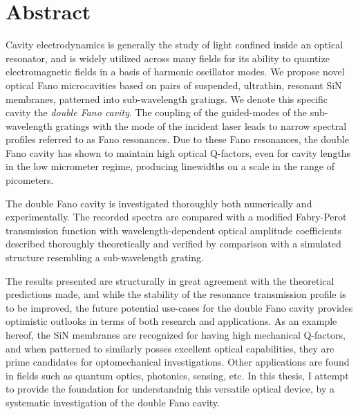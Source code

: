 \section*{Abstract}

Cavity electrodynamics is generally the study of light confined inside an optical resonator, and is widely utilized across many fields for its ability to quantize electromagnetic fields in a basis of harmonic oscillator modes. We propose novel optical Fano microcavities based on pairs of suspended, ultrathin, resonant SiN membranes, patterned into sub-wavelength gratings. We denote this specific cavity the \emph{double Fano cavity}. The coupling of the guided-modes of the sub-wavelength gratings with the mode of the incident laser leads to narrow spectral profiles referred to as Fano resonances. Due to these Fano resonances, the double Fano cavity has shown to maintain high optical Q-factors, even for cavity lengths in the low micrometer regime, producing linewidths on a scale in the range of picometers.  

The double Fano cavity is investigated thoroughly both numerically and experimentally. The recorded spectra are compared with a modified Fabry-Perot transmission function with wavelength-dependent optical amplitude coefficients described thoroughly theoretically and verified by comparison with a simulated structure resembling a sub-wavelength grating. 

The results presented are structurally in great agreement with the theoretical predictions made, and while the stability of the resonance transmission profile is to be improved, the future potential use-cases for the double Fano cavity provides optimistic outlooks in terms of both research and applications. As an example hereof, the SiN membranes are recognized for having high mechanical Q-factors, and when patterned to similarly posses excellent optical capabilities, they are prime candidates for optomechanical investigations. Other applications are found in fields such as quantum optics, photonics, sensing, etc. In this thesis, I attempt to provide the foundation for understandnig this versatile optical device, by a systematic investigation of the double Fano cavity.